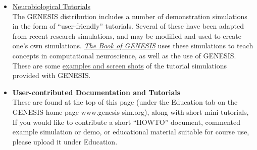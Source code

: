 \documentclass[12pt]{article}
\begin{document}
\begin{itemize}
\item \href{http://www.genesis-sim.org/GENESIS/Tutorials_summary.html}{Neurobiological Tutorials}\\
The GENESIS distribution includes a number of demonstration simulations in the form of ``user-friendly'' tutorials. Several of these have been adapted from recent research simulations, and may be modified and used to create one's own simulations. \href{http://www.genesis-sim.org/GENESIS/bog/bog.html}{\it The Book of GENESIS} uses these simulations to teach concepts in computational neuroscience, as well as the use of GENESIS. These are some  \href{http://www.genesis-sim.org/GENESIS/illtuts/illtuts.html}{examples and screen shots} of the tutorial simulations provided with GENESIS.

\item {\bf User-contributed Documentation and Tutorials}\\
These are found at the top of this page (under the Education tab on the GENESIS home page www.genesis-sim.org), along with short mini-tutorials, If you would like to contribute a short ``HOWTO'' document, commented example simulation or demo, or educational material suitable for course use, please upload it under Education.

\end{itemize}
\end{document}
